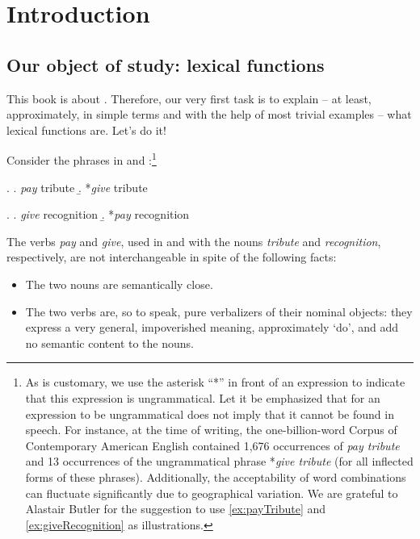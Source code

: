 
\chapter{Introduction}\label{chap:Introduction}

\section{Our object of study: lexical functions}\label{sec:aboutWhat}

This book is about . Therefore, our very first task is to explain -- at least, approximately, in simple terms and with the help of most trivial examples -- what lexical functions are. Let's do it!

Consider the phrases in \Next and \NNext:\footnote{As is customary, we use the asterisk ``*'' in front of an expression to indicate that this expression is ungrammatical. Let it be emphasized that for an expression to be ungrammatical does not imply that it cannot be found in speech. For instance, at the time of writing, the one-billion-word Corpus of Contemporary American English \parencite{Davies2008} contained 1,676 occurrences of \textit{pay tribute} and 13 occurrences of the ungrammatical phrase *\textit{give tribute} (for all inflected forms of these phrases). Additionally, the acceptability of word combinations can fluctuate significantly due to geographical variation. We are grateful to Alastair Butler for the suggestion to use \ref{ex:payTribute} and \ref{ex:giveRecognition} as illustrations.}

\begingroup
\small

\ex.\label{ex:payTribute} \a. \emph{pay} tribute 
     \b. *\emph{give} tribute 

\ex.\label{ex:giveRecognition} \a. \emph{give} recognition 
     \b. *\emph{pay} recognition \hspace{25pt}

\endgroup

The verbs \textit{pay} and \textit{give}, used in \LLast[a] and \Last[a] with the nouns \textit{tribute} and \textit{recognition}, respec­tively, are not interchangeable in spite of the following facts:

\begin{itemize}

\item The two nouns are semantically close.

\item The two verbs are, so to speak, pure verbalizers of their nominal objects: they express a very general, impoverished meaning, approximately `do', and add no semantic content to the nouns.

\end{itemize}

